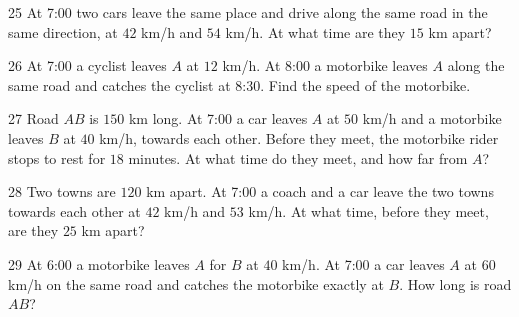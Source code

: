 \gap
\begin{probbox}{25}{\relax}
At 7:00 two cars leave the same place and drive along the same road in the same direction, at $42$ km/h and $54$ km/h. At what time are they $15$ km apart?
\end{probbox}
\gap
\begin{probbox}{26}{\relax}
At 7:00 a cyclist leaves $A$ at $12$ km/h. At 8:00 a motorbike leaves $A$ along the same road and catches the cyclist at 8:30. Find the speed of the motorbike.
\end{probbox}
\gap
\begin{probbox}{27}{\relax}
Road $AB$ is $150$ km long. At 7:00 a car leaves $A$ at $50$ km/h and a motorbike leaves $B$ at $40$ km/h, towards each other. Before they meet, the motorbike rider stops to rest for $18$ minutes. At what time do they meet, and how far from $A$?
\end{probbox}
\gap
\begin{probbox}{28}{\relax}
Two towns are $120$ km apart. At 7:00 a coach and a car leave the two towns towards each other at $42$ km/h and $53$ km/h. At what time, before they meet, are they $25$ km apart?
\end{probbox}
\gap
\begin{probbox}{29}{\relax}
At 6:00 a motorbike leaves $A$ for $B$ at $40$ km/h. At 7:00 a car leaves $A$ at $60$ km/h on the same road and catches the motorbike exactly at $B$. How long is road $AB$?
\end{probbox}
